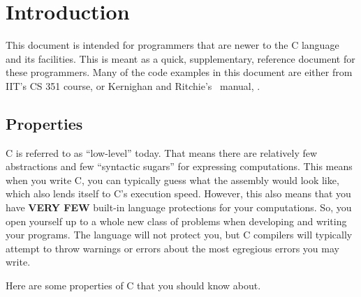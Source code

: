 \section{Introduction}\label{sec:Intro}
This document is intended for programmers that are newer to the C language and its facilities.
This is meant as a quick, supplementary, reference document for these programmers.
Many of the code examples in this document are either from IIT's CS 351 course, or Kernighan and Ritchie's~\cite{KernighanRitchieCProg} manual, .

\subsection{Properties}\label{subsec:Properties}
C is referred to as ``low-level'' today.
That means there are relatively few abstractions and few ``syntactic sugars'' for expressing computations.
This means when you write C, you can typically guess what the assembly would look like, which also lends itself to C's execution speed.
However, this also means that you have \textbf{VERY FEW} built-in language protections for your computations.
So, you open yourself up to a whole new class of problems when developing and writing your programs.
The language will not protect you, but C compilers will typically attempt to throw warnings or errors about the most egregious errors you may write.

Here are some properties of C that you should know about.



